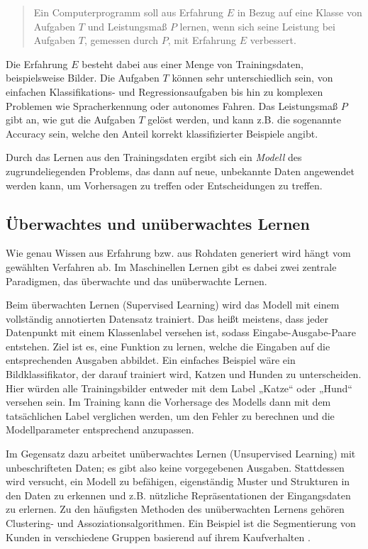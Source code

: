 \begin{quote}
	Ein Computerprogramm soll aus Erfahrung $E$ in Bezug auf eine Klasse von Aufgaben $T$ und Leistungsmaß $P$ lernen, wenn sich seine Leistung bei Aufgaben $T$, gemessen durch $P$, mit Erfahrung $E$ verbessert.
\end{quote}

Die Erfahrung $E$ besteht dabei aus einer Menge von Trainingsdaten, beispielsweise Bilder. Die Aufgaben $T$ können sehr unterschiedlich sein, von einfachen Klassifikations- und Regressionsaufgaben bis hin zu komplexen Problemen wie Spracherkennung oder autonomes Fahren. Das Leistungsmaß $P$ gibt an, wie gut die Aufgaben $T$ gelöst werden, und kann z.B. die sogenannte Accuracy sein, welche den Anteil korrekt klassifizierter Beispiele angibt.

Durch das Lernen aus den Trainingsdaten ergibt sich ein \textit{Modell} des zugrundeliegenden Problems, das dann auf neue, unbekannte Daten angewendet werden kann, um Vorhersagen zu treffen oder Entscheidungen zu treffen.

\subsection{Überwachtes und unüberwachtes Lernen} \label{sec:sup-unsup}

Wie genau Wissen aus Erfahrung bzw. aus Rohdaten generiert wird hängt vom gewählten Verfahren ab. Im Maschinellen Lernen gibt es dabei zwei zentrale Paradigmen, das überwachte und das unüberwachte Lernen.

Beim überwachten Lernen (Supervised Learning) wird das Modell mit einem vollständig annotierten Datensatz trainiert. Das heißt meistens, dass jeder Datenpunkt mit einem Klassenlabel versehen ist, sodass Eingabe-Ausgabe-Paare entstehen. Ziel ist es, eine Funktion zu lernen, welche die Eingaben auf die entsprechenden Ausgaben abbildet. Ein einfaches Beispiel wäre ein Bildklassifikator, der darauf trainiert wird, Katzen und Hunden zu unterscheiden. Hier würden alle Trainingsbilder entweder mit dem Label „Katze“ oder „Hund“ versehen sein. Im Training kann die Vorhersage des Modells dann mit dem tatsächlichen Label verglichen werden, um den Fehler zu berechnen und die Modellparameter entsprechend anzupassen.

Im Gegensatz dazu arbeitet unüberwachtes Lernen (Unsupervised Learning) mit unbeschrifteten Daten; es gibt also keine vorgegebenen Ausgaben. Stattdessen wird versucht, ein Modell zu befähigen, eigenständig Muster und Strukturen in den Daten zu erkennen und z.B. nützliche Repräsentationen der Eingangsdaten zu erlernen. Zu den häufigsten Methoden des unüberwachten Lernens gehören Clustering- und Assoziationsalgorithmen. Ein Beispiel ist die Segmentierung von Kunden in verschiedene Gruppen basierend auf ihrem Kaufverhalten \parencite{}.


